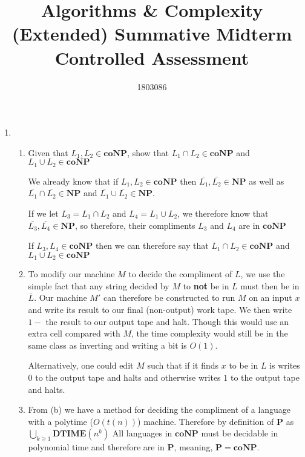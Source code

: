 \documentclass{article}
\title{Algorithms \& Complexity (Extended) Summative Midterm Controlled Assessment}
\author{1803086}
\begin{document}
\maketitle

\begin{enumerate}
  \item

        \begin{enumerate}
          \item Given that $L_{1}, L_{2} \in \mathbf{coNP}$, show that $L_{1} \cap L_{2} \in \mathbf{coNP} $ and $L_{1} \cup L_{2} \in \mathbf{coNP} $

                We already know that if $L_{1}, L_{2} \in \mathbf{coNP}$ then $\bar{L_{1}}, \bar{L_{2}} \in \mathbf{NP} $ as well as $\bar{L_{1}} \cap \bar{L_{2}} \in \mathbf{NP} $ and $\bar{L_{1}} \cup \bar{L_{2}} \in \mathbf{NP} $.

                If we let $L_{3} = L_{1} \cap L_{2}$ and $L_{4} = L_{1} \cup L_{2}$, we therefore know that $\bar{L_3}, \bar{L_{4}} \in \mathbf{NP} $, so therefore, their compliments $L_{3}$ and $L_{4}$ are in $\mathbf{coNP} $

                If $L_{3}, L_{4} \in \mathbf{coNP} $ then we can therefore say that $L_{1}\cap L_{2} \in \mathbf{coNP} $ and $L_{1} \cup L_{2} \in \mathbf{coNP} $

          \item To modify our machine $M$ to decide the compliment of $L$, we use the simple fact that any string decided by $M$ to \textbf{not} be in $L$ must then be in $\bar{L}$. Our machine $M'$ can therefore be constructed to run $M$ on an input $x$ and write its result to our final (non-output) work tape. We then write $1-$ the result to our output tape and halt. Though this would use an extra cell compared with $M$, the time complexity would still be in the same class as inverting and writing a bit is $O(1)$.

                Alternatively, one could edit $M$ such that if it finds $x$ to be in $L$ is writes 0 to the output tape and halts and otherwise writes $1$ to the output tape and halts.

          \item From (b) we have a method for deciding the compliment of a language with a polytime ($O(t(n))$) machine. Therefore by definition of $\mathbf{P}$ as $\displaystyle\bigcup_{k\geq 1}\mathbf{DTIME}(n^{k}) $ All languages in $\mathbf{coNP} $ must be decidable in polynomial time and therefore are in $\mathbf{P}$, meaning, $\mathbf{P} = \mathbf{coNP}  $.


\end{enumerate}
\end{enumerate}
\end{document}
